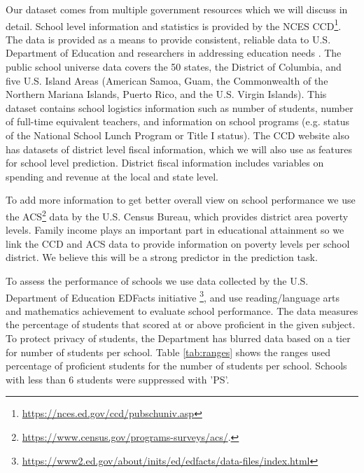 Our dataset comes from multiple government resources which we will discuss in detail. School level information and statistics is provided by the NCES CCD\footnote{\href{https://nces.ed.gov/ccd/pubschuniv.asp}{https://nces.ed.gov/ccd/pubschuniv.asp}}. The data is provided as a means to provide consistent, reliable data to U.S. Department of Education and researchers in addressing education needs \cite{ccdschool}. The public school universe data covers the 50 states, the District of Columbia, and five U.S. Island Areas (American Samoa, Guam, the Commonwealth of the Northern Mariana Islands, Puerto Rico, and the U.S. Virgin Islands). This dataset contains school logistics information such as number of students, number of full-time equivalent teachers, and information on school programs (e.g. status of the National School Lunch Program or Title I status). The CCD website also has datasets of district level fiscal information, which we will also use as features for school level prediction. District fiscal information includes variables on spending and revenue at the local and state level.

To add more information to get better overall view on school performance we use the ACS\footnote{\href{https://www.census.gov/programs-surveys/acs/}{https://www.census.gov/programs-surveys/acs/}.}
data by the U.S. Census Bureau, which provides district area  poverty levels. Family income plays an important part in educational attainment \cite{parentinfluence2005} so we link the CCD and ACS data to provide information on poverty levels per school district. We believe this will be a strong predictor in the prediction task.

To assess the performance of schools we use data collected by the U.S. Department of Education EDFacts initiative \footnote{\href{https://www2.ed.gov/about/inits/ed/edfacts/data-files/index.html}{https://www2.ed.gov/about/inits/ed/edfacts/data-files/index.html}}, and use reading/language arts and mathematics achievement to evaluate school performance. The data measures the percentage of students that scored at or above proficient in the given subject. To protect privacy of students, the Department has blurred data based on a tier for number of students per school. Table \ref{tab:ranges} shows the ranges used percentage of proficient students for the number of students per school. Schools with less than 6 students were suppressed with 'PS'.

